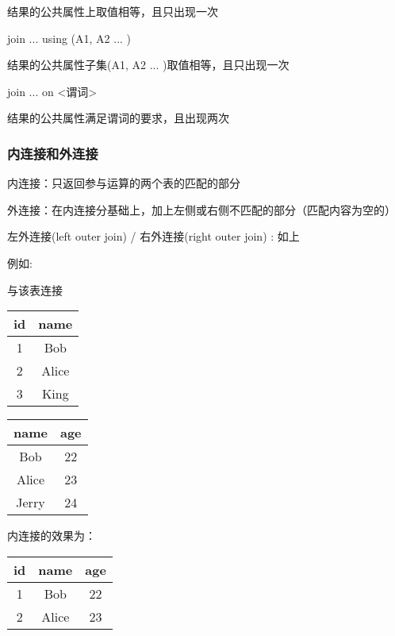\documentclass{article}        %
\begin{document}
结果的公共属性上取值相等，且只出现一次

join ... using (A1, A2 ... )

结果的公共属性子集(A1, A2 ... )取值相等，且只出现一次 

join ... on <谓词> 

结果的公共属性满足谓词的要求，且出现两次

\subsubsection{内连接和外连接}

内连接：只返回参与运算的两个表的匹配的部分

外连接：在内连接分基础上，加上左侧或右侧不匹配的部分（匹配内容为空的）

左外连接(left outer join) / 右外连接(right outer join) : 如上 

例如:

与该表连接

\begin{table}[htbp]
    \begin{minipage}{0.49\linewidth}
        \centering 
        \label{example1}
        \begin{tabular}{|c|c|}
            \hline 
            id&name \\
            \hline 
            1&Bob \\ 
            \hline 
            2&Alice \\ 
            \hline 
            3&King \\
            \hline
        \end{tabular}
    \end{minipage}
    \hfill
    \begin{minipage}{0.49\linewidth}
        \centering 
        \label{example2}
        \begin{tabular}{|c|c|}
            \hline 
            name&age  \\
            \hline 
            Bob & 22  \\ 
            \hline 
            Alice & 23  \\ 
            \hline 
            Jerry & 24\\
            \hline
        \end{tabular}
    \end{minipage}
\end{table}

内连接的效果为：

\begin{table}[htbp]
    \centering
    \label{example01}
    \begin{tabular}{|c|c|c|}
        \hline 
        id&name&age \\ 
        \hline 
        1&Bob&22 \\
        \hline 
        2&Alice&23 \\ 
        \hline 
    \end{tabular}
\end{table}
\end{document}
